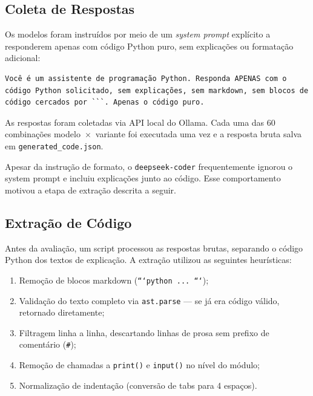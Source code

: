 \documentclass[12pt,
    english,
    french,
    spanish,
    brazil,
    ]{article}
\begin{document}
\subsection{Coleta de Respostas}

Os modelos foram instruídos por meio de um \textit{system prompt}
explícito a responderem apenas com código Python puro, sem explicações
ou formatação adicional:

\begin{lstlisting}[style=python, caption={System prompt utilizado na
coleta de respostas}]
Você é um assistente de programação Python. Responda APENAS com o código Python solicitado, sem explicações, sem markdown, sem blocos de código cercados por ```. Apenas o código puro.
\end{lstlisting}

As respostas foram coletadas via API local do Ollama. Cada uma das 60 combinações modelo~$\times$~variante foi executada uma vez e a resposta bruta salva em \texttt{generated\_code.json}.

Apesar da instrução de formato, o \texttt{deepseek-coder} frequentemente ignorou o \textbf{}{system prompt} e incluiu explicações junto ao código. Esse comportamento motivou a etapa de extração descrita a seguir.

\subsection{Extração de Código}

Antes da avaliação, um script processou as respostas brutas, separando o código Python dos textos de explicação. A
extração utilizou as seguintes heurísticas:

\begin{enumerate}
    \item Remoção de blocos markdown (\texttt{```python ... ```});
    \item Validação do texto completo via \texttt{ast.parse} — se já
    era código válido, retornado diretamente;
    \item Filtragem linha a linha, descartando linhas de prosa sem
    prefixo de comentário (\texttt{\#});
    \item Remoção de chamadas a \texttt{print()} e \texttt{input()}
    no nível do módulo;
    \item Normalização de indentação (conversão de tabs para 4 espaços).
\end{enumerate}
\end{document}
